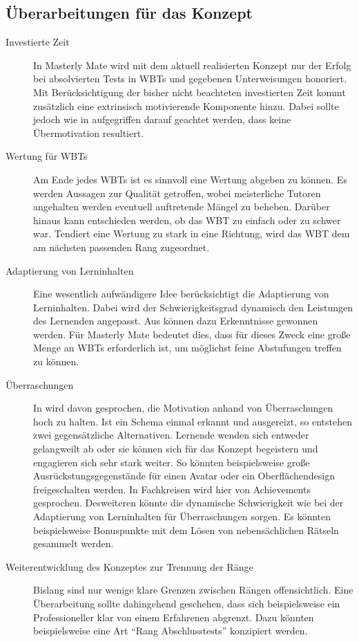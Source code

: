 \subsection{Überarbeitungen für das Konzept}
\begin{description}
\item[Investierte Zeit] In Masterly Mate wird mit dem aktuell
realisierten Konzept nur der Erfolg bei absolvierten Tests in WBTs
und gegebenen Unterweisungen honoriert. Mit Berücksichtigung der bisher nicht
beachteten investierten Zeit kommt zusätzlich eine extrinsisch motivierende
Komponente hinzu. Dabei sollte jedoch wie in \cite{korte:2009} aufgegriffen
darauf geachtet werden, dass keine Übermotivation resultiert.
\item[Wertung für WBTs] Am Ende jedes WBTs ist es sinnvoll eine Wertung abgeben
zu können. Es werden Aussagen zur Qualität getroffen, wobei meisterliche
Tutoren angehalten werden eventuell auftretende Mängel zu beheben. Darüber
hinaus kann entschieden werden, ob das WBT zu einfach oder zu schwer war.
Tendiert eine Wertung zu stark in eine Richtung, wird das WBT dem am nächsten passenden Rang zugeordnet.
\item[Adaptierung von Lerninhalten] Eine wesentlich aufwändigere Idee
berücksichtigt die Adaptierung von Lerninhalten. Dabei wird der
Schwierigkeitsgrad dynamisch den Leistungen des Lernenden angepasst. Aus
\cite{knall:2005} können dazu Erkenntnisse gewonnen werden. Für Masterly Mate
bedeutet dies, dass für dieses Zweck eine große Menge an WBTs erforderlich ist,
um möglichst feine Abstufungen treffen zu können.
\item[Überraschungen] In \cite{korte:2009} wird davon gesprochen, die
Motivation anhand von Überraschungen hoch zu halten. Ist ein Schema einmal
erkannt und ausgereizt, so entstehen zwei gegensätzliche Alternativen.
Lernende wenden sich entweder gelangweilt ab oder sie können sich für das
Konzept begeistern und engagieren sich sehr stark weiter. So könnten
beispielsweise große Ausrückstungsgegenstände für einen Avatar oder ein
Oberflächendesign freigeschalten werden. In Fachkreisen wird hier von
Achievements gesprochen. Desweiteren könnte die dynamische Schwierigkeit wie bei
der Adaptierung von Lerninhalten für Überraschungen sorgen. Es könnten
beispielsweise Bonuspunkte mit dem Lösen von nebensächlichen Rätseln
gesammelt werden.
\item[Weiterentwicklung des Konzeptes zur Trennung der Ränge] Bislang sind nur
wenige klare Grenzen zwischen Rängen offensichtlich. Eine Überarbeitung sollte
dahingehend geschehen, dass sich beispielsweise ein Professioneller klar von
einem Erfahrenen abgrenzt. Dazu könnten beispielsweise eine Art "`Rang
Abschlusstests"' konzipiert werden.
\end{description}

